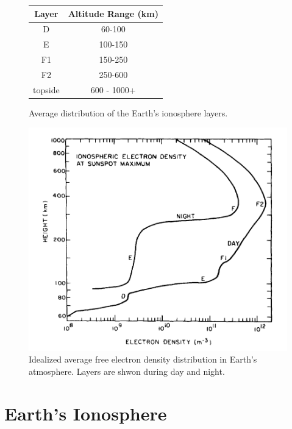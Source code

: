 \begin{figure}[htb]
\centering
\begin{minipage}[b]{0.48\textwidth}
\centering
\begin{tabular}{|c|c|}
\hline
Layer & Altitude Range (km) \\
\hline
D & 60-100 \\
\hline
E & 100-150 \\
\hline
F1 & 150-250 \\
\hline
F2 & 250-600 \\
\hline
topside & 600 - 1000+ \\
\hline
\end{tabular}
\caption{Average distribution of the Earth's ionosphere layers.}
\label{Tab:iono_layer}
\vspace{2cm}
\end{minipage}%
\begin{minipage}[b]{0.02\textwidth}
\hspace{1cm}
\end{minipage}%
\begin{minipage}[b]{0.48\textwidth}
\centering
\includegraphics[width=0.95\linewidth]{Ionosphere/figures/atmosphere_layers.jpg}
\caption{Idealized average free electron density distribution in Earth's atmosphere. Layers are shwon during day and night. }
\label{Fig:iono_layer}
\end{minipage}
\end{figure}



\section{Earth's Ionosphere}

